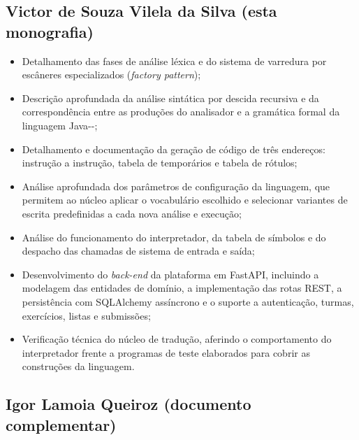 \subsection{Victor de Souza Vilela da Silva (esta monografia)}

\begin{itemize}
    \item Detalhamento das fases de análise léxica e do sistema de varredura por escâneres especializados (\textit{factory pattern});
    \item Descrição aprofundada da análise sintática por descida recursiva e da correspondência entre as produções do analisador e a gramática formal da linguagem Java-{}-;
    \item Detalhamento e documentação da geração de código de três endereços: instrução a instrução, tabela de temporários e tabela de rótulos;
    \item Análise aprofundada dos parâmetros de configuração da linguagem, que permitem ao núcleo aplicar o vocabulário escolhido e selecionar variantes de escrita predefinidas a cada nova análise e execução;
    \item Análise do funcionamento do interpretador, da tabela de símbolos e do despacho das chamadas de sistema de entrada e saída;
    \item Desenvolvimento do \textit{back-end} da plataforma em FastAPI, incluindo a modelagem das entidades de domínio, a implementação das rotas REST, a persistência com SQLAlchemy assíncrono e o suporte a autenticação, turmas, exercícios, listas e submissões;
    \item Verificação técnica do núcleo de tradução, aferindo o comportamento do interpretador frente a programas de teste elaborados para cobrir as construções da linguagem.
\end{itemize}

\subsection{Igor Lamoia Queiroz (documento complementar)}

